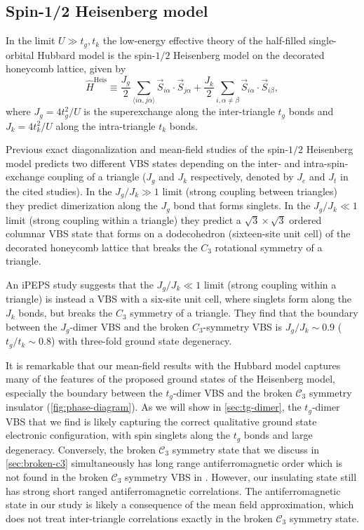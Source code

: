 \documentclass[reprint,aps,prb,amsmath,amssymb]{revtex4-2}
\begin{document}
\subsection{Spin-1/2 Heisenberg model}
\label{sec:real-space-para-heis-literature}

In the limit $U \gg t_g,t_k$ the low-energy effective theory of the half-filled single-orbital Hubbard model is the spin-$1/2$ Heisenberg model on the decorated honeycomb lattice, given by
%
\begin{equation} \label{eq:ham-heis}
	\hat{H}^{\textrm{Heis}} \equiv \frac{J_g}{2} \sum_{\langle i\alpha, j\alpha \rangle} \vec{S}_{i\alpha} \cdot \vec{S}_{j\alpha} + \frac{J_k}{2} \sum_{i,\alpha\neq\beta} \vec{S}_{i\alpha} \cdot \vec{S}_{i\beta},
\end{equation}
%
where $J_g = 4t_g^2 / U$ is the superexchange along the inter-triangle $t_g$ bonds and $J_k = 4t_k^2 / U$ along the intra-triangle $t_k$ bonds.

Previous exact diagonalization and mean-field studies of the spin-$1/2$ Heisenberg model \cite{Richter2004,Misguich2007,Yang2010} predicts two different VBS states depending on the inter- and intra-spin-exchange coupling of a triangle ($J_g$ and $J_k$ respectively, denoted by $J_e$ and $J_t$ in the cited studies). In the $J_g / J_k \gg 1$ limit (strong coupling between triangles) they predict dimerization along the $J_g$ bond that forms singlets. In the $J_g / J_k \ll 1$ limit (strong coupling within a triangle) they predict a $\sqrt{3} \times \sqrt{3}$ ordered columnar VBS state that forms on a dodecohedron (sixteen-site unit cell) of the decorated honeycomb lattice that breaks the $C_3$ rotational symmetry of a triangle.

An iPEPS study \cite{Jahromi2018} suggests that the $J_g / J_k \ll 1$ limit (strong coupling within a triangle) is instead a VBS with a six-site unit cell, where singlets form along the $J_k$ bonds, but breaks the $C_3$ symmetry of a triangle. They find that the boundary between the $J_g$-dimer VBS and the broken $C_3$-symmetry VBS is $J_g / J_k \sim 0.9$ ($t_g/t_k \sim 0.8$) with three-fold ground state degeneracy.

It is remarkable that our mean-field results with the Hubbard model captures many of the features of the proposed ground states of the Heisenberg model, especially the boundary between the $t_g$-dimer VBS and the broken $\mathcal{C}_3$ symmetry insulator (\cref{fig:phase-diagram}). As we will show in \cref{sec:tg-dimer}, the $t_g$-dimer VBS that we find is likely capturing the correct qualitative ground state electronic configuration, with spin singlets along the $t_g$ bonds and large degeneracy. Conversely, the broken $\mathcal{C}_3$ symmetry state that we discuss in \cref{sec:broken-c3} simultaneously has long range antiferromagnetic order which is not found in the broken $\mathcal{C}_3$ symmetry VBS in \cite{Jahromi2018}. However, our insulating state still has strong short ranged antiferromagnetic correlations. The antiferromagnetic state in our study is likely a consequence of the mean field approximation, which does not treat inter-triangle correlations exactly in the broken $\mathcal{C}_3$ symmetry state.
\end{document}
